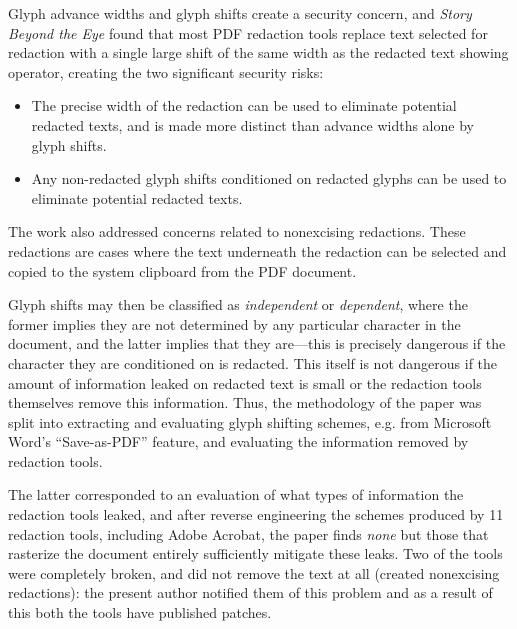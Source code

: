Glyph advance widths and glyph shifts create a security concern, and \emph{Story Beyond the Eye} found that most PDF redaction tools replace text selected for redaction with a single large shift of the same width as the redacted text showing operator, creating the two significant security risks:
\begin{itemize}
	\item The precise width of the redaction can be used to eliminate potential redacted texts, and is made more distinct than advance widths alone by glyph shifts.
	\item Any non-redacted glyph shifts conditioned on redacted glyphs can be used to eliminate potential redacted texts.
\end{itemize}
The work also addressed concerns related to nonexcising redactions. 
These redactions are cases where the text underneath the redaction can be selected and copied to the system clipboard from the PDF document.

Glyph shifts may then be classified as \emph{independent} or \emph{dependent}, where the former implies they are not determined by any particular character in the document, and the latter implies that they are---this is precisely dangerous if the character they are conditioned on is redacted.
This itself is not dangerous if the amount of information leaked on redacted text is small or the redaction tools themselves remove this information.
Thus, the methodology of the paper was split into extracting and evaluating glyph shifting schemes, e.g. from Microsoft Word's ``Save-as-PDF'' feature, and evaluating the information removed by redaction tools.

The latter corresponded to an evaluation of what types of information the redaction tools leaked, and after reverse engineering the schemes produced by 11 redaction tools, including Adobe Acrobat, the paper finds \emph{none} but those that rasterize the document entirely sufficiently mitigate these leaks.
Two of the tools were completely broken, and did not remove the text at all (created nonexcising redactions): the present author notified them of this problem and as a result of this both the tools have published patches.

